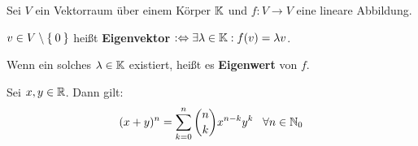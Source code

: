 \begin{definition}%
	Sei $V$ ein Vektorraum über einem Körper $\mathbb{K}$ und $f: V \rightarrow V$ eine 
	lineare Abbildung.

	$v \in V \setminus \Set{0}$ heißt \textbf{Eigenvektor} $:\Leftrightarrow \exists \lambda \in \mathbb{K}: f(v) = \lambda v$.

	Wenn ein solches $\lambda \in \mathbb{K}$ existiert, heißt es \textbf{Eigenwert} von $f$.
\end{definition}

\begin{satz*}%
	Sei $x, y \in \mathbb{R}$. Dann gilt:
	\[(x+y)^n = \sum_{k=0}^{n}\binom{n}{k} x^{n-k}y^{k} \;\;\; \forall n \in \mathbb{N}_0\]
\end{satz*}